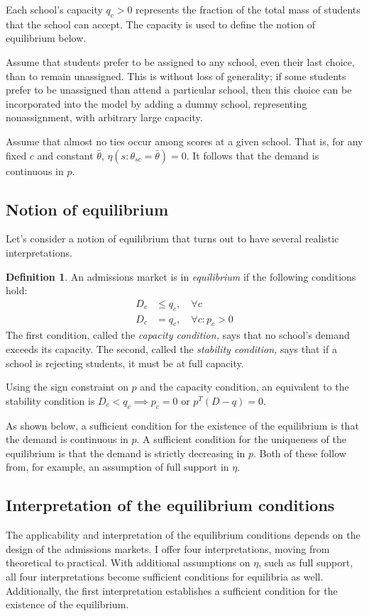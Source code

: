 \documentclass[12pt]{article}
\theoremstyle{definition}
\newtheorem{definition}{Definition}
\begin{document}
Each school's capacity $q_c > 0$ represents the fraction of the total mass of students that the school can accept. The capacity is used to define the notion of equilibrium below.

Assume that students prefer to be assigned to any school, even their last choice, than to remain unassigned. This is without loss of generality; if some students prefer to be unassigned than attend a particular school, then this choice can be incorporated into the model by adding a dummy school, representing nonassignment, with arbitrary large capacity. 

Assume that almost no ties occur among scores at a given school. That is, for any fixed $c$ and constant $\bar \theta$, $\eta( s: \theta_{sc} = \bar \theta) = 0$. It follows that the demand is continuous in $p$. 

\subsection{Notion of equilibrium}
Let's consider a notion of equilibrium that turns out to have several realistic interpretations. 

\begin{definition} \label{marketeqconditions} An admissions market is in \emph{equilibrium} if the following conditions hold:
\begin{align} D_c &\leq q_c, \quad \forall c \label{capacitycondition} \\
D_c &= q_c, \quad \forall c: p_c > 0 \label{stabilitycondition}
\end{align}
The first condition, called the \emph{capacity condition,} says that no school's demand exceeds its capacity. The second, called the \emph{stability condition,} says that if a school is rejecting students, it must be at full capacity.
\end{definition}

Using the sign constraint on $p$ and the capacity condition, an equivalent to the stability condition is $D_c < q_c \implies p_c = 0$ or $p^T \left(D - q\right) = 0$.

As shown below, a sufficient condition for the existence of the equilibrium is that the demand is continuous in $p$. A sufficient condition for the uniqueness of the equilibrium is that the demand is strictly decreasing in $p$. Both of these follow from, for example, an assumption of full support in $\eta$. 

\subsection{Interpretation of the equilibrium conditions}
The applicability and interpretation of the equilibrium conditions depends on the design of the admissions markets. I offer four interpretations, moving from theoretical to practical. With additional assumptions on $\eta$, such as full support, all four interpretations become sufficient conditions for equilibria as well. Additionally, the first interpretation establishes a sufficient condition for the existence of the equilibrium. 
\end{document}
